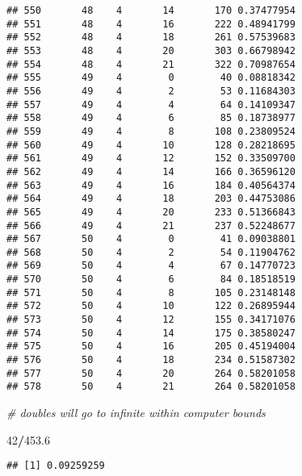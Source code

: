 \documentclass[
]{article}
\newenvironment{Shaded}{\begin{snugshade}}{\end{snugshade}}
\newcommand{\CommentTok}[1]{\textcolor[rgb]{0.56,0.35,0.01}{\textit{#1}}}
\newcommand{\DecValTok}[1]{\textcolor[rgb]{0.00,0.00,0.81}{#1}}
\newcommand{\FloatTok}[1]{\textcolor[rgb]{0.00,0.00,0.81}{#1}}
\newcommand{\SpecialCharTok}[1]{\textcolor[rgb]{0.81,0.36,0.00}{\textbf{#1}}}
\begin{document}
\begin{verbatim}
## 550       48    4       14       170 0.37477954
## 551       48    4       16       222 0.48941799
## 552       48    4       18       261 0.57539683
## 553       48    4       20       303 0.66798942
## 554       48    4       21       322 0.70987654
## 555       49    4        0        40 0.08818342
## 556       49    4        2        53 0.11684303
## 557       49    4        4        64 0.14109347
## 558       49    4        6        85 0.18738977
## 559       49    4        8       108 0.23809524
## 560       49    4       10       128 0.28218695
## 561       49    4       12       152 0.33509700
## 562       49    4       14       166 0.36596120
## 563       49    4       16       184 0.40564374
## 564       49    4       18       203 0.44753086
## 565       49    4       20       233 0.51366843
## 566       49    4       21       237 0.52248677
## 567       50    4        0        41 0.09038801
## 568       50    4        2        54 0.11904762
## 569       50    4        4        67 0.14770723
## 570       50    4        6        84 0.18518519
## 571       50    4        8       105 0.23148148
## 572       50    4       10       122 0.26895944
## 573       50    4       12       155 0.34171076
## 574       50    4       14       175 0.38580247
## 575       50    4       16       205 0.45194004
## 576       50    4       18       234 0.51587302
## 577       50    4       20       264 0.58201058
## 578       50    4       21       264 0.58201058
\end{verbatim}

\begin{Shaded}
\begin{Highlighting}[]
\CommentTok{\# doubles will go to infinite within computer bounds}
\end{Highlighting}
\end{Shaded}

\begin{Shaded}
\begin{Highlighting}[]
\DecValTok{42}\SpecialCharTok{/}\FloatTok{453.6}
\end{Highlighting}
\end{Shaded}

\begin{verbatim}
## [1] 0.09259259
\end{verbatim}
\end{document}
